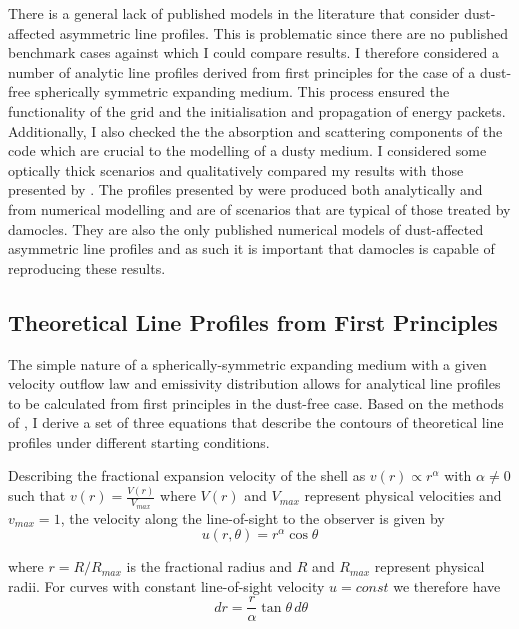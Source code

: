 There is a general lack of published models in the literature that consider dust-affected asymmetric line profiles.  This is problematic since there are no published benchmark cases against which I could compare results.  I therefore considered a number of analytic line profiles derived from first principles for the case of a dust-free spherically symmetric expanding medium.  This process ensured the functionality of the grid and the initialisation and propagation of energy packets.  Additionally, I also checked the the absorption and scattering components of the code which are crucial to the modelling of a dusty medium.  I  considered some optically thick scenarios and qualitatively compared my results with those presented by \citet{Lucy1989}.  The profiles presented by  \citet{Lucy1989} were produced both analytically and from numerical modelling and are of scenarios that are typical of those treated by {\sc damocles}.  They are also the only published numerical models of dust-affected asymmetric line profiles and as such it is important that {\sc damocles} is capable of reproducing these results.

\subsection{Theoretical Line Profiles from First Principles}
\label{analytics}

The simple nature of a spherically-symmetric expanding medium with a given velocity outflow law and emissivity distribution allows for analytical line profiles to be calculated from first principles in the dust-free case.  Based on the methods of \cite{Gerasimovic1933},  I derive a set of three equations that describe the contours of theoretical line profiles under different starting conditions.



Describing the fractional expansion velocity of the shell as $v(r) \propto 
r^\alpha$ with $\alpha \neq 0$ such that $v(r)=\frac{V(r)}{V_{max}}$ where 
$V(r)$ and $V_{max}$ represent physical velocities and $v_{max}=1$, the velocity along the line-of-sight to the observer is given by 
\begin{equation}
\label{eqn:radial_vel}
u(r,\theta)=r^\alpha \cos \theta
\end{equation}

\noindent where $r=R/R_{max}$ is the fractional radius and $R$ and $R_{max}$ represent physical radii. For curves with constant line-of-sight velocity $u=const$ we therefore have
\begin{equation}
\,d r = \frac{r}{\alpha} \tan \theta \,d \theta
\end{equation}

